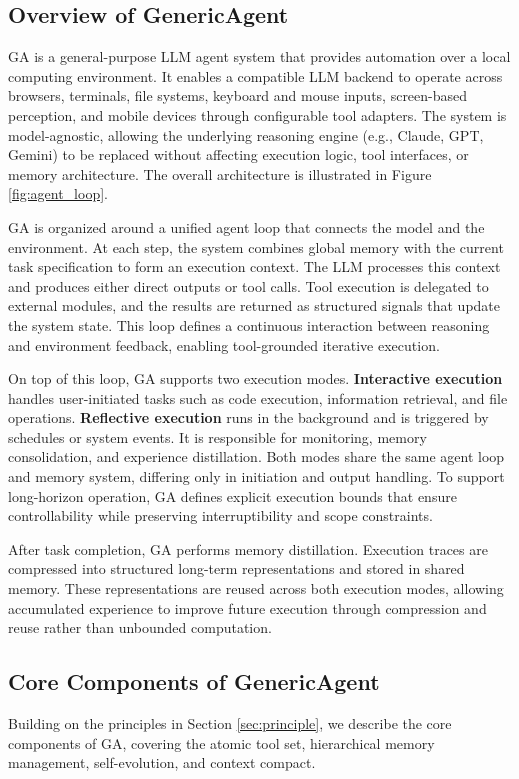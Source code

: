 \subsection{Overview of GenericAgent}
\label{sec:overview}
GA is a general-purpose LLM agent system that provides automation over a local computing environment. It enables a compatible LLM backend to operate across browsers, terminals, file systems, keyboard and mouse inputs, screen-based perception, and mobile devices through configurable tool adapters. The system is model-agnostic, allowing the underlying reasoning engine (e.g., Claude, GPT, Gemini) to be replaced without affecting execution logic, tool interfaces, or memory architecture. The overall architecture is illustrated in Figure \ref{fig:agent_loop}.

GA is organized around a unified agent loop that connects the model and the environment. At each step, the system combines global memory with the current task specification to form an execution context. The LLM processes this context and produces either direct outputs or tool calls. Tool execution is delegated to external modules, and the results are returned as structured signals that update the system state. This loop defines a continuous interaction between reasoning and environment feedback, enabling tool-grounded iterative execution.

On top of this loop, GA supports two execution modes. \textbf{Interactive execution} handles user-initiated tasks such as code execution, information retrieval, and file operations. \textbf{Reflective execution} runs in the background and is triggered by schedules or system events. It is responsible for monitoring, memory consolidation, and experience distillation. Both modes share the same agent loop and memory system, differing only in initiation and output handling. To support long-horizon operation, GA defines explicit execution bounds that ensure controllability while preserving interruptibility and scope constraints.

After task completion, GA performs memory distillation. Execution traces are compressed into structured long-term representations and stored in shared memory. These representations are reused across both execution modes, allowing accumulated experience to improve future execution through compression and reuse rather than unbounded computation.

\subsection{Core Components of GenericAgent}
\label{sec:core_design}
Building on the principles in Section \ref{sec:principle}, we describe the core components of GA, covering the atomic tool set, hierarchical memory management, self-evolution, and context compact.

